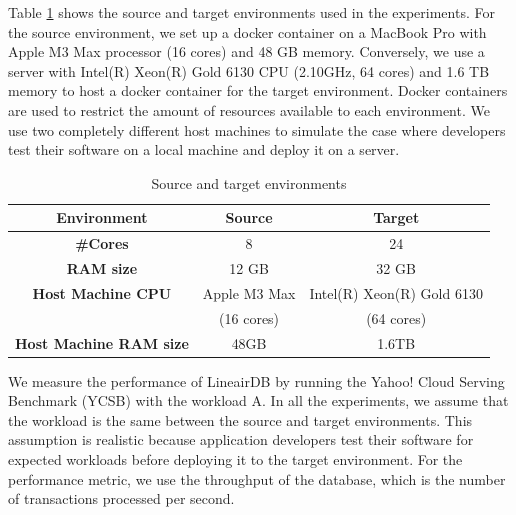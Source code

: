 Table \ref{tab:env} shows the source and target environments used in the experiments.
For the source environment, we set up a docker container on a MacBook Pro with Apple M3 Max processor (16 cores) and 48 GB memory.
Conversely, we use a server with Intel(R) Xeon(R) Gold 6130 CPU (2.10GHz, 64 cores) and 1.6 TB memory to host a docker container for the target environment.
Docker containers are used to restrict the amount of resources available to each environment.
We use two completely different host machines to simulate the case where developers test their software on a local machine and deploy it on a server.

\begin{table}[tb]
    \caption{Source and target environments}
    \label{tab:env}
    \centering
    \begin{tabular}{|c|c|c|}
        \hline
        \textbf{Environment} & \textbf{Source} & \textbf{Target} \\
        \hline
        \textbf{\#Cores} & 8 & 24 \\
        \hline
        \textbf{RAM size} & 12 GB & 32 GB \\
        \hline
        \textbf{Host Machine CPU} & Apple M3 Max &  Intel(R) Xeon(R) Gold 6130 \\
        & (16 cores) & (64 cores) \\
        \hline
        \textbf{Host Machine RAM size} & 48GB & 1.6TB \\
        \hline
    \end{tabular}
\end{table}

We measure the performance of LineairDB by running the Yahoo! Cloud Serving Benchmark (YCSB)\cite{ycsb} with the workload A.
In all the experiments, we assume that the workload is the same between the source and target environments.
This assumption is realistic because application developers test their software for expected workloads before deploying it to the target environment.
For the performance metric, we use the throughput of the database, which is the number of transactions processed per second.


